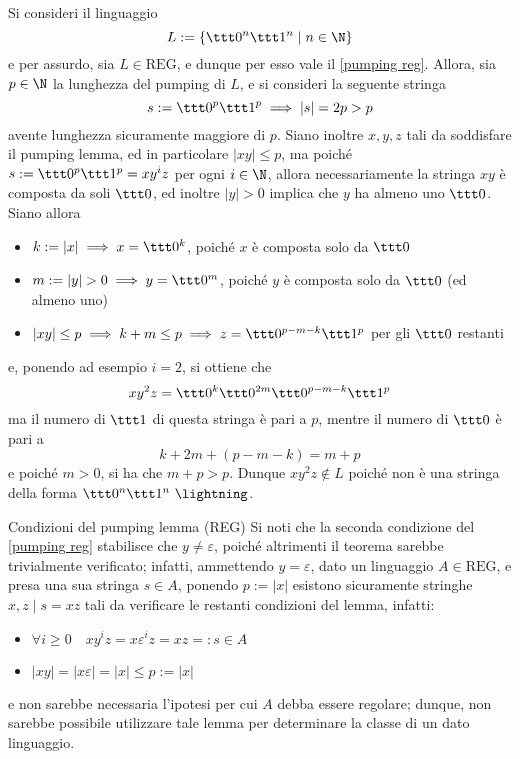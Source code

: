 \documentclass[a4paper, 12pt]{report}
\begin{document}
    \begin{example}
        \label{non reg ex}
        Si consideri il linguaggio $$L := \{\ttt 0 ^n \ttt 1 ^n \mid n \in \N\}$$ e per assurdo, sia $L \in \mathrm{REG}$, e dunque per esso vale il \cref{pumping reg}. Allora, sia $p \in \N$ la lunghezza del pumping di $L$, e si consideri la seguente stringa $$s := \ttt 0 ^p \ttt 1^p \implies |s| = 2p > p$$ avente lunghezza sicuramente maggiore di $p$. Siano inoltre $x, y, z$ tali da soddisfare il pumping lemma, ed in particolare $|xy| \le p$, ma poiché $s := \ttt 0^p \ttt 1^p = xy^iz$ per ogni $i \in \N$, allora necessariamente la stringa $xy$ è composta da soli $\ttt 0$, ed inoltre $|y| > 0$ implica che $y$ ha almeno uno $\ttt 0$. Siano allora

        \begin{itemize}
            \item $k := |x| \implies x = \ttt 0^k$, poiché $x$ è composta solo da $\ttt 0$
            \item $m := |y| > 0 \implies y = \ttt 0^m$, poiché $y$ è composta solo da $\ttt 0$ (ed almeno uno)
            \item $|xy| \le p \implies k + m \le p \implies z = \ttt 0^{p-m-k} \ttt 1^p$ per gli $\ttt 0$ restanti
        \end{itemize}

        e, ponendo ad esempio $i = 2$, si ottiene che $$xy^2z = \ttt 0^k \ttt 0^{2m} \ttt 0^{p-m-k} \ttt 1^p$$ ma il numero di $\ttt 1$ di questa stringa è pari a $p$, mentre il numero di $\ttt 0$ è pari a $$k + 2m + (p - m - k) = m + p$$ e poiché $m > 0$, si ha che $m + p > p$. Dunque $xy^2z \notin L$ poiché non è una stringa della forma $\ttt 0 ^n \ttt 1^n \ \lightning$.
    \end{example}

    \begin{framedobs}{Condizioni del pumping lemma (REG)}
        Si noti che la seconda condizione del \cref{pumping reg} stabilisce che $y \neq \varepsilon$, poiché altrimenti il teorema sarebbe trivialmente verificato; infatti, ammettendo $y = \varepsilon$, dato un linguaggio $A \in \mathrm{REG}$, e presa una sua stringa $s \in A$, ponendo $p := |x|$ esistono sicuramente stringhe $x, z \mid s = xz$ tali da verificare le restanti condizioni del lemma, infatti:

        \begin{itemize}
            \item $\forall i \ge 0 \quad xy^iz = x \varepsilon^iz  = xz =: s \in A$
            \item $|xy| = |x \varepsilon| = |x| \le p := |x|$
        \end{itemize}

        e non sarebbe necessaria l'ipotesi per cui $A$ debba essere regolare; dunque, non sarebbe possibile utilizzare tale lemma per determinare la classe di un dato linguaggio.
    \end{framedobs}
\end{document}
